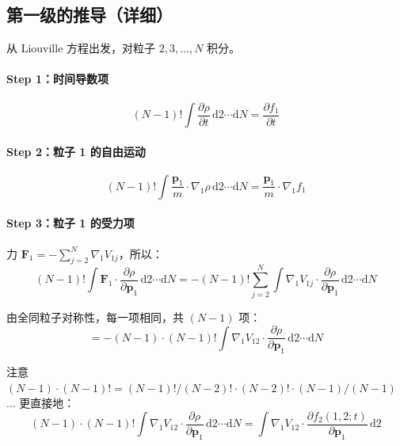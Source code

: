\documentclass[11pt,a4paper]{article}
\newcommand{\piu}{\mathbf{p}}
\begin{document}
\subsection{第一级的推导（详细）}

从 Liouville 方程出发，对粒子 $2,3,\ldots,N$ 积分。

\paragraph{Step 1：时间导数项}
\begin{equation}
(N-1)!\int \frac{\partial \rho}{\partial t}\,\mathrm{d} 2\cdots\mathrm{d} N = \frac{\partial f_1}{\partial t}
\end{equation}

\paragraph{Step 2：粒子 1 的自由运动}
\begin{equation}
(N-1)!\int \frac{\piu_1}{m}\cdot\nabla_1\rho\,\mathrm{d} 2\cdots\mathrm{d} N = \frac{\piu_1}{m}\cdot\nabla_1 f_1
\end{equation}

\paragraph{Step 3：粒子 1 的受力项}

力 $\mathbf{F}_1 = -\sum_{j=2}^N \nabla_1 V_{1j}$，所以：
\begin{equation}
(N-1)!\int \mathbf{F}_1\cdot\frac{\partial\rho}{\partial\piu_1}\,\mathrm{d} 2\cdots\mathrm{d} N 
= -(N-1)!\sum_{j=2}^N \int \nabla_1 V_{1j}\cdot\frac{\partial\rho}{\partial\piu_1}\,\mathrm{d} 2\cdots\mathrm{d} N
\end{equation}

由全同粒子对称性，每一项相同，共 $(N-1)$ 项：
\begin{equation}
= -(N-1)\cdot(N-1)!\int \nabla_1 V_{12}\cdot\frac{\partial\rho}{\partial\piu_1}\,\mathrm{d} 2\cdots\mathrm{d} N
\end{equation}

注意 $(N-1)\cdot(N-1)! = (N-1)!/(N-2)!\cdot(N-2)!\cdot(N-1)/(N-1)$... 更直接地：
\begin{equation}
(N-1)\cdot(N-1)!\int \nabla_1 V_{12}\cdot\frac{\partial\rho}{\partial\piu_1}\,\mathrm{d} 2\cdots\mathrm{d} N 
= \int \nabla_1 V_{12}\cdot\frac{\partial f_2(1,2;t)}{\partial\piu_1}\,\mathrm{d} 2
\end{equation}
\end{document}
